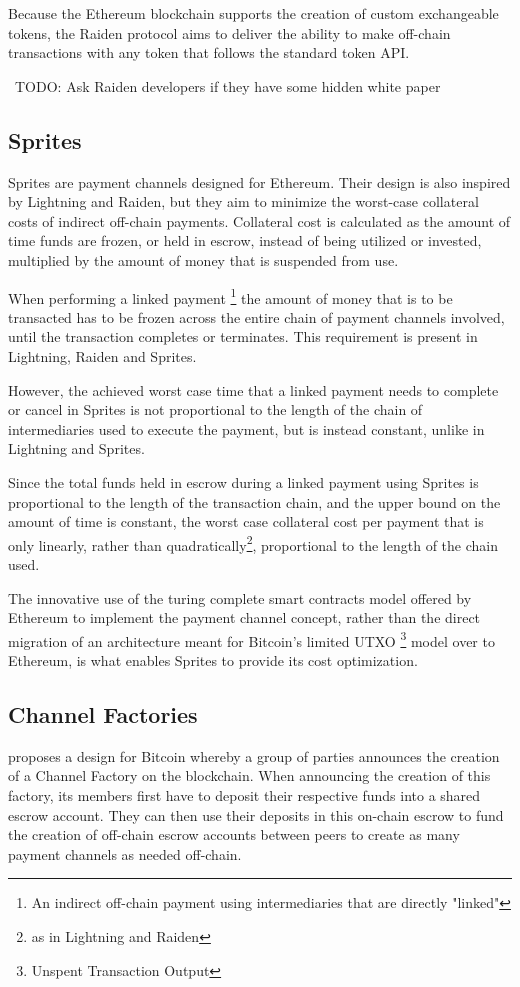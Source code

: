 \documentclass[12pt]{article}
\newcommand{\todo}[1]{{\color{red}\ TODO: {#1}}}
\begin{document}
Because the Ethereum blockchain supports the creation of custom exchangeable tokens, the Raiden protocol aims to deliver the ability to make off-chain transactions with any token that follows the standard token API\cite{ethereum}.

\todo{Ask Raiden developers if they have some hidden white paper}


\subsection{Sprites}
Sprites\cite{sprites} are payment channels designed for Ethereum. Their design is also inspired by Lightning and Raiden, but they aim to minimize the worst-case collateral costs of indirect off-chain payments. Collateral cost is calculated as the amount of time funds are frozen, or held in escrow, instead of being utilized or invested, multiplied by the amount of money that is suspended from use.

When performing a linked payment
\footnote{An indirect off-chain payment using intermediaries that are directly "linked"}
the amount of money that is to be transacted has to be frozen across the entire chain of payment channels involved, until the transaction completes or terminates. This requirement is present in Lightning, Raiden and Sprites.

However, the achieved worst case time that a linked payment needs to complete or cancel in Sprites is not proportional to the length of the chain of intermediaries used to execute the payment, but is instead constant, unlike in Lightning and Sprites.

Since the total funds held in escrow during a linked payment using Sprites is proportional to the length of the transaction chain, and the upper bound on the amount of time is constant, the worst case collateral cost per payment that is only linearly, rather than quadratically\footnote{as in Lightning and Raiden}, proportional to the length of the chain used.

The innovative use of the turing complete smart contracts model offered by Ethereum to implement the payment channel concept, rather than the direct migration of an architecture meant for Bitcoin's limited UTXO
\footnote{Unspent Transaction Output}
model over to Ethereum, is what enables Sprites to provide its cost optimization.

\subsection{Channel Factories}
\cite{scale} proposes a design for Bitcoin whereby a group of parties announces the creation of a Channel Factory on the blockchain. When announcing the creation of this factory, its members first have to deposit their respective funds into a shared escrow account. They can then use their deposits in this on-chain escrow to fund the creation of off-chain escrow accounts between peers to create as many payment channels as needed off-chain.
\end{document}
